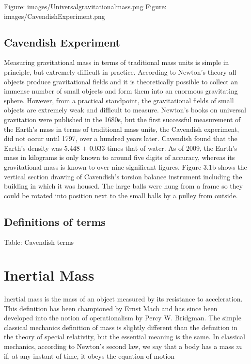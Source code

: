 \documentclass{book}
\begin{document}
	Figure: images/Universalgravitationalmass.png
	Figure: images/CavendishExperiment.png
	
	\subsection{Cavendish Experiment}
	Measuring gravitational mass in terms of traditional mass units is simple in principle, but extremely difficult in practice. According to Newton's theory all objects produce gravitational fields and it is theoretically possible to collect an immense number of small objects and form them into an enormous gravitating sphere. However, from a practical standpoint, the gravitational fields of small objects are extremely weak and difficult to measure. Newton's books on universal gravitation were published in the 1680s, but the first successful measurement of the Earth's mass in terms of traditional mass units, the Cavendish experiment, did not occur until 1797, over a hundred years later. Cavendish found that the Earth's density was 5.448 $\pm$ 0.033 times that of water. As of 2009, the Earth's mass in kilograms is only known to around five digits of accuracy, whereas its gravitational mass is known to over nine significant figures.  Figure 3.1b shows the vertical section drawing of Cavendish's torsion balance instrument including the building in which it was housed. The large balls were hung from a frame so they could be rotated into position next to the small balls by a pulley from outside.
	
	\subsection{Definitions of terms}
	Table: Cavendish terms
	
	\section{Inertial Mass}
	\paragraph{}
	Inertial mass is the mass of an object measured by its resistance to acceleration. This definition has been championed by Ernst Mach and has since been developed into the notion of operationalism by Percy W. Bridgman. The simple classical mechanics definition of mass is slightly different than the definition in the theory of special relativity, but the essential meaning is the same. In classical mechanics, according to Newton's second law, we say that a body has a mass $m$ if, at any instant of time, it obeys the equation of motion
	
\end{document}
